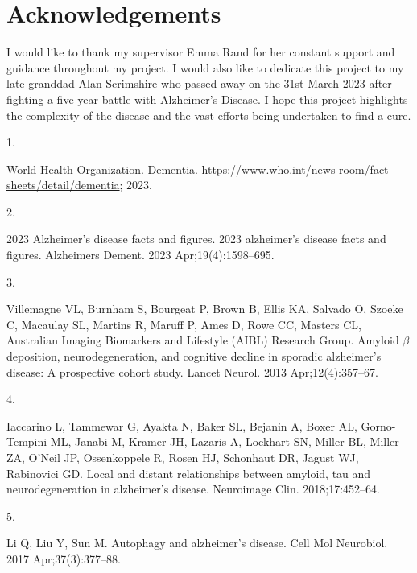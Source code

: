 \documentclass[
  a4paper,
]{article}
\newlength{\cslhangindent}
\newlength{\csllabelwidth}
\newlength{\cslentryspacingunit} %
\newenvironment{CSLReferences}[2] %
 {%
  \setlength{\parindent}{0pt}
  \ifodd #1
  \let\oldpar\par
  \def\par{\hangindent=\cslhangindent\oldpar}
  \fi
  \setlength{\parskip}{#2\cslentryspacingunit}
 }%
 {}
\newcommand{\CSLLeftMargin}[1]{\parbox[t]{\csllabelwidth}{#1}}
\newcommand{\CSLRightInline}[1]{\parbox[t]{\linewidth - \csllabelwidth}{#1}\break}
\begin{document}
\hypertarget{acknowledgements}{%
\section{Acknowledgements}\label{acknowledgements}}

I would like to thank my supervisor Emma Rand for her constant support
and guidance throughout my project. I would also like to dedicate this
project to my late granddad Alan Scrimshire who passed away on the 31st
March 2023 after fighting a five year battle with Alzheimer's Disease. I
hope this project highlights the complexity of the disease and the vast
efforts being undertaken to find a cure.

\hypertarget{refs}{}
\begin{CSLReferences}{0}{0}
\leavevmode{}%
\CSLLeftMargin{1. }%
\CSLRightInline{World Health Organization. Dementia.
\url{https://www.who.int/news-room/fact-sheets/detail/dementia}; 2023. }

\leavevmode{}%
\CSLLeftMargin{2. }%
\CSLRightInline{2023 Alzheimer's disease facts and figures. 2023
alzheimer's disease facts and figures. Alzheimers Dement. 2023
Apr;19(4):1598--695. }

\leavevmode{}%
\CSLLeftMargin{3. }%
\CSLRightInline{Villemagne VL, Burnham S, Bourgeat P, Brown B, Ellis KA,
Salvado O, Szoeke C, Macaulay SL, Martins R, Maruff P, Ames D, Rowe CC,
Masters CL, Australian Imaging Biomarkers and Lifestyle (AIBL) Research
Group. Amyloid \(\beta\) deposition, neurodegeneration, and cognitive
decline in sporadic alzheimer's disease: A prospective cohort study.
Lancet Neurol. 2013 Apr;12(4):357--67. }

\leavevmode{}%
\CSLLeftMargin{4. }%
\CSLRightInline{Iaccarino L, Tammewar G, Ayakta N, Baker SL, Bejanin A,
Boxer AL, Gorno-Tempini ML, Janabi M, Kramer JH, Lazaris A, Lockhart SN,
Miller BL, Miller ZA, O'Neil JP, Ossenkoppele R, Rosen HJ, Schonhaut DR,
Jagust WJ, Rabinovici GD. Local and distant relationships between
amyloid, tau and neurodegeneration in alzheimer's disease. Neuroimage
Clin. 2018;17:452--64. }

\leavevmode{}%
\CSLLeftMargin{5. }%
\CSLRightInline{Li Q, Liu Y, Sun M. Autophagy and alzheimer's disease.
Cell Mol Neurobiol. 2017 Apr;37(3):377--88. }


\end{CSLReferences}
\end{document}

